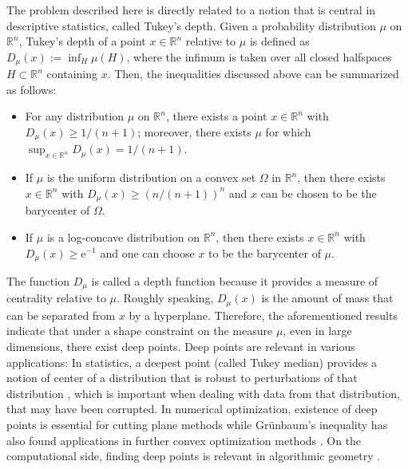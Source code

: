 \documentclass[sts]{imsart}
\theoremstyle{definition}
\theoremstyle{remark}
\newcommand{\R}{\mathbb{R}}
\newcommand{\e}{\mathrm{e}}
\begin{document}
The problem described here is directly related to a notion that is central in descriptive statistics, called Tukey's depth.
Given a probability distribution $\mu$ on $\R^n$, Tukey's depth of a point $x\in \R^n$ relative to $\mu$ is defined as $D_\mu(x):=\inf_{H}\mu(H)$, where the infimum is taken over all closed halfspaces $H \subset \R^n$ containing $x$.
Then, the inequalities discussed above can be summarized as follows: 
\begin{itemize}
    \item For any distribution $\mu$ on $\R^n$, there exists a point $x\in\R^n$ with $D_\mu(x)\geq 1/(n+1)$; moreover, there exists $\mu$ for which $\sup_{x\in\R^n}D_\mu(x)=1/(n+1)$.
    \item If $\mu$ is the uniform distribution on a convex set $\Omega$ in $\R^n$, then there exists $x\in\R^n$ with $D_\mu(x)\geq (n/(n+1))^n$ and $x$ can be chosen to be the barycenter of $\Omega$.
    \item If $\mu$ is a log-concave distribution on $\R^n$, then there exists $x\in\R^n$ with $D_\mu(x)\geq \e^{-1}$ and one can choose $x$ to be the barycenter of $\mu$. 
\end{itemize}
The function $D_\mu$ is called a depth function \cite{zuo2000general} because it provides a measure of centrality relative to $\mu$.
Roughly speaking, $D_\mu(x)$ is the amount of mass that can be separated from $x$ by a hyperplane.
Therefore, the aforementioned results indicate that under a shape constraint on the measure $\mu$, even in large dimensions, there exist deep points.
Deep points are relevant in various applications:
In statistics, a deepest point (called Tukey median) provides a notion of center of a distribution that is robust to perturbations of that distribution \cite[Section 3.2.7]{SurveyDepth}, which is important when dealing with data from that distribution, that may have been corrupted. In numerical optimization, existence of deep points is essential for cutting plane methods \cite{bubeck2015convex} while Gr\"unbaum's inequality has also found applications in further convex optimization methods \cite{BV}. On the computational side, finding deep points is relevant in algorithmic geometry \cite{de2019discrete}.
\end{document}
